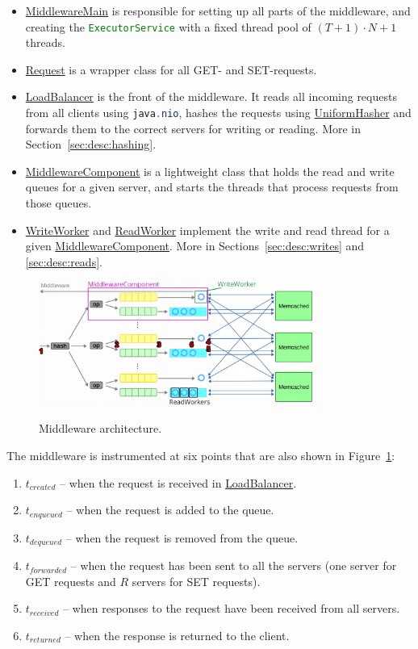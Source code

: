 \documentclass[11pt]{article}
\newcommand{\code}[1]{\lstinline[language=Java]{#1}}
\newcommand{\linkmain}[1]{\href{https://gitlab.inf.ethz.ch/pungast/asl-fall16-project/blob/master/src/main/java/asl/#1.java}{#1}}
\begin{document}
\begin{itemize}
\item \linkmain{MiddlewareMain} is responsible for setting up all parts of the middleware, and creating the \code{ExecutorService} with a fixed thread pool of $(T+1) \cdot N + 1$ threads.
\item \linkmain{Request} is a wrapper class for all GET- and SET-requests.
\item \linkmain{LoadBalancer} is the front of the middleware. It reads all incoming requests from all clients using \code{java.nio}, hashes the requests using \linkmain{UniformHasher} and forwards them to the correct servers for writing or reading. More in Section~\ref{sec:desc:hashing}.
\item \linkmain{MiddlewareComponent} is a lightweight class that holds the read and write queues for a given server, and starts the threads that process requests from those queues.
\item \linkmain{WriteWorker} and \linkmain{ReadWorker} implement the write and read thread for a given \linkmain{MiddlewareComponent}. More in Sections~\ref{sec:desc:writes} and \ref{sec:desc:reads}.
\end{itemize}

\begin{figure}[h]
\centering
\includegraphics[width=0.8\textwidth]{figures/structure.png}
\label{fig:structure}
\caption{Middleware architecture.}
\end{figure}

The middleware is instrumented at six points that are also shown in Figure~\ref{fig:structure}:
\begin{enumerate}
\item $t_{created}$ -- when the request is received in \linkmain{LoadBalancer}.
\item $t_{enqueued}$ -- when the request is added to the queue.
\item $t_{dequeued}$ -- when the request is removed from the queue.
\item $t_{forwarded}$ -- when the request has been sent to all the servers (one server for GET requests and $R$ servers for SET requests).
\item $t_{received}$ -- when responses to the request have been received from all servers.
\item $t_{returned}$ -- when the response is returned to the client.
\end{enumerate}
\end{document}
